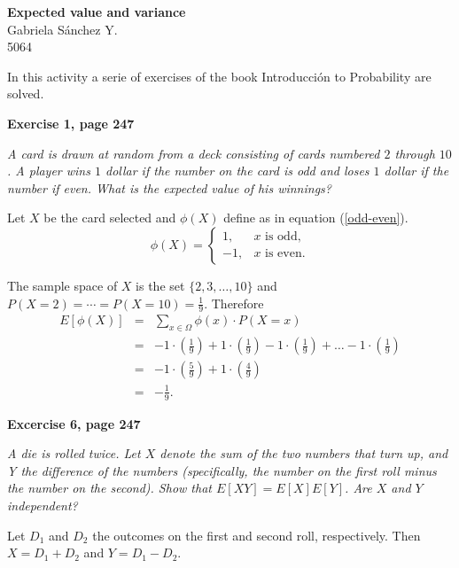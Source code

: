 \documentclass[12pt]{article}
\begin{document}
	\thispagestyle{empty}

	\begin{center}
		{\Large \bf Expected value and variance}\\
		Gabriela S\'anchez Y.\\
		5064
	\end{center}
  
	In this activity a serie of exercises of the book Introducción to Probability \cite{prob2003} are solved.
	
	{\bf Exercise 1, page 247}
	
	{\em A card is drawn at random from a deck consisting of cards numbered $2$ through $10$. A player wins $1$ dollar if the number on the card is odd and loses $1$ dollar if the number if even. What is the expected value of his winnings?}
	
	Let $X$ be the card selected and $\phi(X)$ define as in equation (\ref{odd-even}). 
	\begin{equation}
	\phi(X)= \left\{ \begin{array}{rc}
	1, & x \,\, \text{is odd},	\\
	-1, & x \,\, \text{is even}. 
	\end{array}
	\right.
	\label{odd-even}
	\end{equation}
	
	The sample space of $X$ is the set $\{2, 3, \ldots, 10\}$ and $P(X=2) = \cdots = P(X=10) = \frac{1}{9}$. Therefore
	\begin{eqnarray*}
	E[\phi(X)] &=& \sum_{x \in \Omega} \phi(x) \cdot P(X=x) \\
	&=& -1 \cdot \left(\frac{1}{9} \right) + 1 \cdot \left( \frac{1}{9} \right) -1 \cdot \left(\frac{1}{9} \right) + \ldots -1 \cdot \left(\frac{1}{9} \right) \\
	&=& -1 \cdot \left(\frac{5}{9} \right) + 1 \cdot \left( \frac{4}{9} \right) \\
	&=& -\frac{1}{9}.
	\end{eqnarray*}
	
	{\bf Excercise 6, page 247}
	
	{\em A die is rolled twice. Let $X$ denote the sum of the two numbers that turn up, and Y the difference of the numbers (specifically, the number on the first roll minus the number on the second). Show that $E[XY] = E[X]E[Y]$. Are $X$ and $Y$ independent?}
	
	Let $D_1$ and $D_2$ the outcomes on the first and second roll, respectively. Then $X = D_1 + D_2$ and $Y=D_1 - D_2$. 
	
\end{document}
